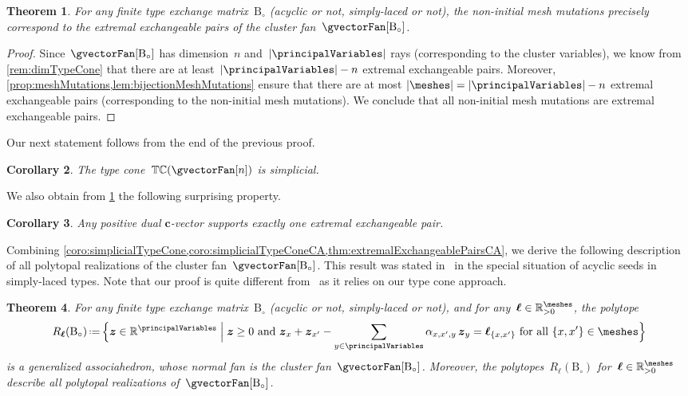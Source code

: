 \documentclass{amsart}
\newtheorem{theorem}{Theorem}[section]
\newtheorem{corollary}[theorem]{Corollary}
\theoremstyle{definition}
\newcommand{\R}{\mathbb{R}} %
\renewcommand{\b}[1]{{\boldsymbol{#1}}} %
\newcommand{\Bigset}[2]{\Big\{ #1 \;\Big|\; #2 \Big\}} %
\newcommand{\eqdef}{\mbox{\,\raisebox{0.2ex}{\scriptsize\ensuremath{\mathrm:}}\ensuremath{=}\,}} %
\newcommand{\typeCone}{\mathbb{TC}} %
\newcommand{\B}{\mathrm{B}} %
\begin{document}
\begin{theorem}
\label{thm:extremalExchangeablePairsCA}
For any finite type exchange matrix~$\B_\circ$ (acyclic or not, simply-laced or not), the non-initial mesh mutations precisely correspond to the extremal exchangeable pairs of the cluster fan~$\gvectorFan[\B_\circ]$.
\end{theorem}

\begin{proof}
Since~$\gvectorFan[\B_\circ]$ has dimension~$n$ and~$|\principalVariables|$ rays (corresponding to the cluster variables), we know from \cref{rem:dimTypeCone} that there are at least~$|\principalVariables| - n$ extremal exchangeable pairs.
Moreover, \cref{prop:meshMutations,lem:bijectionMeshMutations} ensure that there are at most $|\meshes| = |\principalVariables| - n$ extremal exchangeable pairs (corresponding to the non-initial mesh mutations).
We conclude that all non-initial mesh mutations are extremal exchangeable pairs.
\end{proof}

Our next statement follows from the end of the previous proof.

\begin{corollary}
\label{coro:simplicialTypeConeCA}
The type cone~$\typeCone(\gvectorFan[n])$ is simplicial.
\end{corollary}

We also obtain from \cref{thm:extremalExchangeablePairsCA} the following surprising property.

\begin{corollary}
Any positive dual $\b{c}$-vector supports exactly one extremal exchangeable pair.
\end{corollary}

Combining \cref{coro:simplicialTypeCone,coro:simplicialTypeConeCA,thm:extremalExchangeablePairsCA}, we derive the following description of all polytopal realizations of the cluster fan~$\gvectorFan[\B_\circ]$.
This result was stated in~\cite{BazierMatteDouvilleMousavandThomasYildirim} in the special situation of acyclic seeds in simply-laced types.
Note that our proof is quite different from~\cite{BazierMatteDouvilleMousavandThomasYildirim} as it relies on our type cone approach.

\begin{theorem}
\label{thm:allPolytopalRealizationsCA}
For any finite type exchange matrix~$\B_\circ$ (acyclic or not, simply-laced or not), and for any~$\b{\ell} \in \R_{>0}^{\meshes}$, the polytope
\[
R_{\b{\ell}}(\B_\circ) \eqdef \Bigset{\b{z} \in \R^{\principalVariables}}{\b{z} \ge 0 \text{ and } \b{z}_x + \b{z}_{x'} - \sum_{y \in \principalVariables} \alpha_{x,x',y} \, \b{z}_{y} = \b{\ell}_{\{x,x'\}} \text{ for all } \{x,x'\} \in \meshes}
\]
is a generalized associahedron, whose normal fan is the cluster fan~$\gvectorFan[\B_\circ]$.
Moreover, the polytopes~$R_\b{\ell}(\B_\circ)$ for~$\b{\ell} \in \R_{>0}^{\meshes}$ describe all polytopal realizations of~$\gvectorFan[\B_\circ]$.
\end{theorem}
\end{document}
